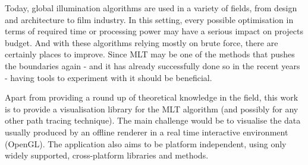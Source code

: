 \documentclass[a4paper,12pt,oneside,final]{memoir}
\begin{document}
Today, global illumination algorithms are used in a variety of fields, from design and architecture to film industry. In this setting, every possible optimisation in terms of required time or processing power may have a serious impact on projects budget. And with these algorithms relying mostly on brute force, there are certainly places to improve. Since MLT may be one of the methods that pushes the boundaries again - and it has already successfully done so in the recent years - having tools to experiment with it should be beneficial. 

Apart from providing a round up of theoretical knowledge in the field, this work is to provide a visualisation library for the MLT algorithm (and possibly for any other path tracing technique). The main challenge would be to visualise the data usually produced by an offline renderer in a real time interactive environment (OpenGL). The application also aims to be platform independent, using only widely supported, cross-platform libraries and methods.






\backmatter

\nocite{*}


\end{document}
